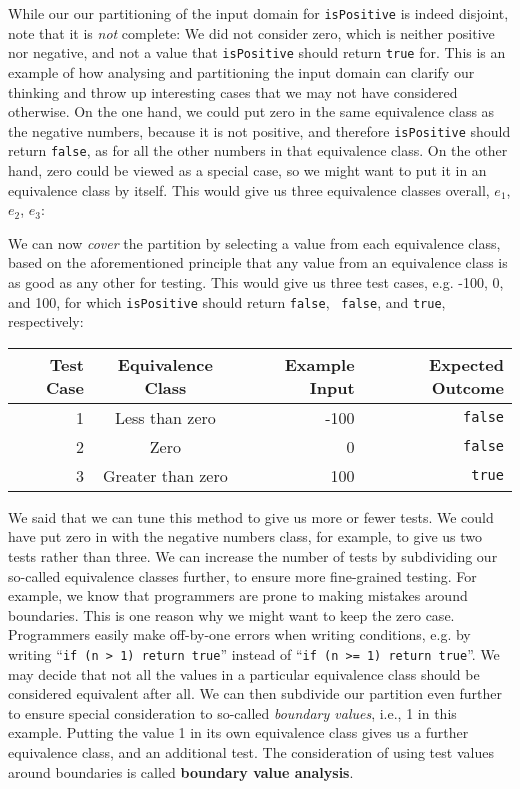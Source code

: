 While our our partitioning of the input domain for {\tt isPositive} is indeed
disjoint, note that it is {\it not} complete: We did not consider zero, which is
neither positive nor negative, and not a value that {\tt isPositive} should
return {\tt true} for. This is an example of how analysing and partitioning the
input domain can clarify our thinking and throw up interesting cases that we may
not have considered otherwise. 
%
On the one hand, we could put zero in the same equivalence class as the negative
numbers, because it is not positive, and therefore {\tt isPositive} should
return {\tt false}, as for all the other numbers in that equivalence class. On
the other hand, zero could be viewed as a special case, so we might want to put
it in an equivalence class by itself. This would give us three equivalence
classes overall, $e_1$, $e_2$, $e_3$:


We can now {\it cover} the partition by selecting a value from each equivalence class,
based on the aforementioned principle that any value from an equivalence class
is as good as any other for testing. This would give us three test cases, e.g.
-100, 0, and 100, for which {\tt isPositive} should return {\tt false}, {\tt
false}, and {\tt true}, respectively:

\begin{center}
\begin{tabular}{r|crr}
    {\bf Test Case} & {\bf Equivalence Class} & {\bf Example Input} & {\bf Expected Outcome} \\
    \midrule
    1 & Less than zero    & -100 & {\tt false} \\
    2 & Zero              &    0 & {\tt false} \\
    3 & Greater than zero &  100 & {\tt true}  \\
\end{tabular}
\end{center}

We said that we can tune this method to give us more or fewer tests. We could
have put zero in with the negative numbers class, for example, to give us two
tests rather than three. We can increase the number of tests by subdividing our
so-called equivalence classes further, to ensure more fine-grained testing.
%
For example, we know that programmers are prone to making mistakes around
boundaries. This is one reason why we might want to keep the zero case.
Programmers easily make off-by-one errors when writing conditions, e.g. by
writing ``{\tt if (n > 1) return true}'' instead of ``{\tt if (n >= 1) return
true}''. We may decide that not all the values in a particular equivalence class
should be considered equivalent after all. We can then subdivide our partition
even further to ensure special consideration to so-called {\it boundary values},
i.e., 1 in this example. Putting the value 1 in its own equivalence class gives
us a further equivalence class, and an additional test.
%
The consideration of using test values around boundaries is called {\bf boundary
value analysis}.

